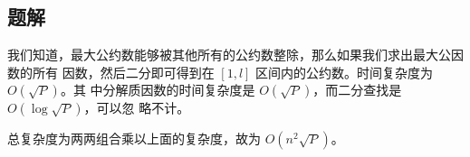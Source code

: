 \subsection{题解}
\begin{frame} %
我们知道，最大公约数能够被其他所有的公约数整除，那么如果我们求出最大公因数的所有
因数，然后二分即可得到在 $[1, l]$ 区间内的公约数。时间复杂度为 $O(\sqrt P)$。其
中分解质因数的时间复杂度是 $O(\sqrt P)$，而二分查找是 $O(\log \sqrt P)$，可以忽
略不计。

总复杂度为两两组合乘以上面的复杂度，故为 $O(n^2 \sqrt P)$。
\end{frame}
